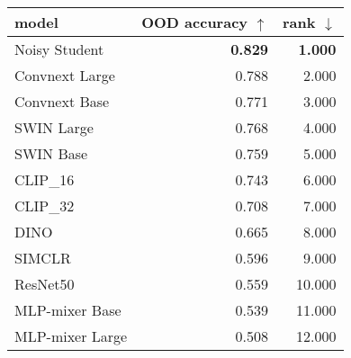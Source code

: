 \begin{tabular}{lrr}
\toprule
          model & OOD accuracy $\uparrow$ & rank $\downarrow$ \\
\midrule
  Noisy Student &          \textbf{0.829} &    \textbf{1.000} \\
 Convnext Large &                   0.788 &             2.000 \\
  Convnext Base &                   0.771 &             3.000 \\
     SWIN Large &                   0.768 &             4.000 \\
      SWIN Base &                   0.759 &             5.000 \\
       CLIP\_16 &                   0.743 &             6.000 \\
       CLIP\_32 &                   0.708 &             7.000 \\
           DINO &                   0.665 &             8.000 \\
         SIMCLR &                   0.596 &             9.000 \\
       ResNet50 &                   0.559 &            10.000 \\
 MLP-mixer Base &                   0.539 &            11.000 \\
MLP-mixer Large &                   0.508 &            12.000 \\
\bottomrule
\end{tabular}


